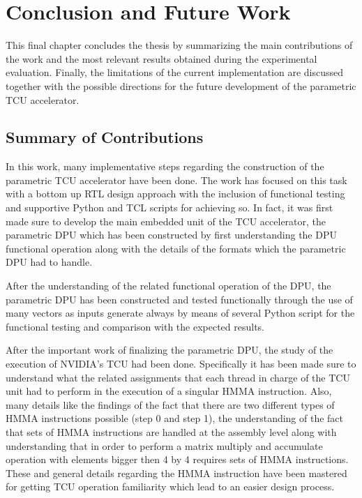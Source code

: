 \chapter{Conclusion and Future Work}

This final chapter concludes the thesis by summarizing the main
contributions of the work and the most relevant results obtained during
the experimental evaluation. Finally, the limitations of the current
implementation are discussed together with the possible directions for
the future development of the parametric TCU accelerator.

\section{Summary of Contributions}

In this work, many implementative steps regarding the construction of the parametric TCU accelerator have been done. The work has focused on this task with a bottom up RTL design approach with the inclusion of functional testing and supportive Python and TCL scripts for achieving so. In fact, it was first made sure to develop the main embedded unit of the TCU accelerator, the parametric DPU which has been constructed by first understanding the DPU functional operation along with the details of the formats which the parametric DPU had to handle.

After the understanding of the related functional operation of the DPU, the parametric DPU has been constructed and tested functionally through the use of many vectors as inputs generate always by means of several Python script for the functional testing and comparison with the expected results. 

After the important work of finalizing the parametric DPU, the study of the execution of NVIDIA's TCU had been done. Specifically it has been made sure to understand what the related assignments that each thread in charge of the TCU unit had to perform in the execution of a singular HMMA instruction. Also, many details like the findings of the fact that there are two different types of HMMA instructions possible (step 0 and step 1), the understanding of the fact that sets of HMMA instructions are handled at the assembly level along with understanding that in order to perform a matrix multiply and accumulate operation with elements bigger then 4 by 4 requires sets of HMMA instructions. These and general details  regarding the HMMA instruction have been mastered for getting TCU operation familiarity which lead to an easier design process.

